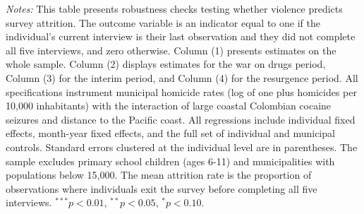 \documentclass[12pt,letter,english,intoc,bibliography=totoc,index=totoc,BCOR10mm,captions=tableheading,nottitlepage,fleqn]{article}
\theoremstyle{break}
\begin{document}
\begin{table}[H]
\centering
\caption{Does Violence Predict Attrition?}
\label{tab:violence_attrition}
\centering
\scriptsize 

\begin{minipage}{0.95\linewidth}
    \scriptsize \singlespacing
    \textit{Notes:} This table presents robustness checks testing whether violence predicts survey attrition. The outcome variable is an indicator equal to one if the individual's current interview is their last observation and they did not complete all five interviews, and zero otherwise. Column (1) presents estimates on the whole sample. Column (2) displays estimates for the war on drugs period, Column (3) for the interim period, and Column (4) for the resurgence period. All specifications instrument municipal homicide rates (log of one plus homicides per 10,000 inhabitants) with the interaction of large coastal Colombian cocaine seizures and distance to the Pacific coast. All regressions include individual fixed effects, month-year fixed effects, and the full set of individual and municipal controls. Standard errors clustered at the individual level are in parentheses. The sample excludes primary school children (ages 6-11) and municipalities with populations below 15,000. The mean attrition rate is the proportion of observations where individuals exit the survey before completing all five interviews. $^{***}p<0.01$, $^{**}p<0.05$, $^{*}p<0.10$.
    \end{minipage}
\end{table}
\end{document}
